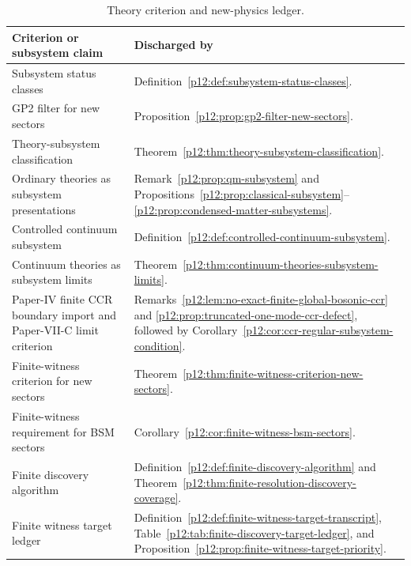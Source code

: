 \documentclass[12pt,a4paper]{article}
\begin{document}
\begin{table}[htbp]
\centering
\small
\begin{tabularx}{\textwidth}{@{}
>{\raggedright\arraybackslash}p{}
>{\raggedright\arraybackslash}X
@{}}
\toprule
\textbf{Criterion or subsystem claim} & \textbf{Discharged by} \\
\midrule
Subsystem status classes
& Definition~\ref{p12:def:subsystem-status-classes}. \\

GP2 filter for new sectors
& Proposition~\ref{p12:prop:gp2-filter-new-sectors}. \\

Theory-subsystem classification
& Theorem~\ref{p12:thm:theory-subsystem-classification}. \\

Ordinary theories as subsystem presentations
& Remark~\ref{p12:prop:qm-subsystem} and Propositions~\ref{p12:prop:classical-subsystem}--\ref{p12:prop:condensed-matter-subsystems}. \\

Controlled continuum subsystem
& Definition~\ref{p12:def:controlled-continuum-subsystem}. \\

Continuum theories as subsystem limits
& Theorem~\ref{p12:thm:continuum-theories-subsystem-limits}. \\

Paper-IV finite CCR boundary import and Paper-VII-C limit criterion
& Remarks~\ref{p12:lem:no-exact-finite-global-bosonic-ccr} and
\ref{p12:prop:truncated-one-mode-ccr-defect}, followed by
Corollary~\ref{p12:cor:ccr-regular-subsystem-condition}. \\

Finite-witness criterion for new sectors
& Theorem~\ref{p12:thm:finite-witness-criterion-new-sectors}. \\

Finite-witness requirement for BSM sectors
& Corollary~\ref{p12:cor:finite-witness-bsm-sectors}. \\

Finite discovery algorithm
& Definition~\ref{p12:def:finite-discovery-algorithm} and
Theorem~\ref{p12:thm:finite-resolution-discovery-coverage}. \\

Finite witness target ledger
& Definition~\ref{p12:def:finite-witness-target-transcript},
Table~\ref{p12:tab:finite-discovery-target-ledger}, and
Proposition~\ref{p12:prop:finite-witness-target-priority}. \\
\bottomrule
\end{tabularx}
\caption[Theory criterion and new-physics ledger]{Theory criterion and new-physics ledger.}
\label{p12:tab:theory-criterion-new-physics-ledger}
\end{table}
\end{document}
